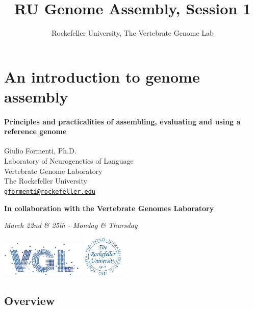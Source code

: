 \documentclass[
]{article}
\title{RU Genome Assembly, Session 1}
\author{Rockefeller University, The Vertebrate Genome Lab}
\date{}
\begin{document}
\maketitle

{
\setcounter{tocdepth}{2}
\tableofcontents
}
\hypertarget{an-introduction-to-genome-assembly}{%
\section{An introduction to genome
assembly}\label{an-introduction-to-genome-assembly}}

\hypertarget{principles-and-practicalities-of-assembling-evaluating-and-using-a-reference-genome}{%
\paragraph{Principles and practicalities of assembling, evaluating and
using a reference
genome}\label{principles-and-practicalities-of-assembling-evaluating-and-using-a-reference-genome}}

\leavevmode\hypertarget{hello}{}%
Giulio Formenti, Ph.D.\\
Laboratory of Neurogenetics of Language\\
Vertebrate Genome Laboratory\\
The Rockefeller University\\
\href{mailto:gformenti@rockefeller.edu}{\nolinkurl{gformenti@rockefeller.edu}}

\textbf{In collaboration with the Vertebrate Genomes Laboratory}

\emph{March 22nd \& 25th - Monday \& Thursday}

\includegraphics[width=0.3\textwidth,height=\textheight]{../imgs/VGL_logo.png}
\includegraphics[width=0.15\textwidth,height=\textheight]{../imgs/RU_logo.png}

\hypertarget{overview}{%
\subsection{Overview}\label{overview}}
\end{document}
